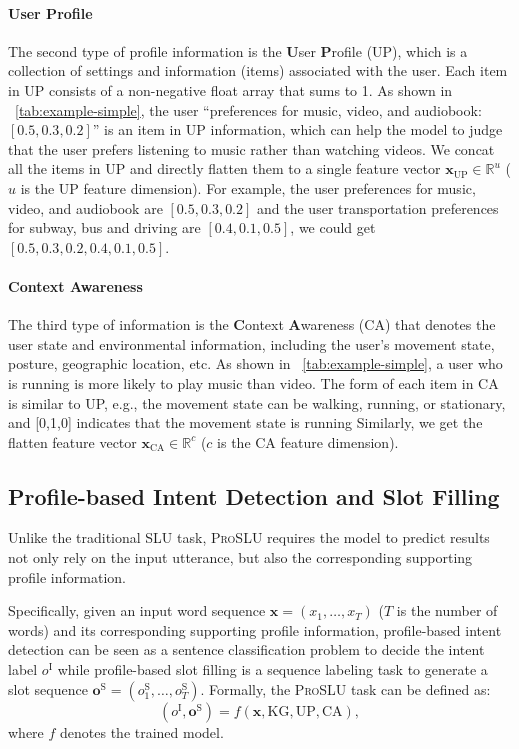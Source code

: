 \documentclass[letterpaper]{article} \usepackage{aaai22}  \usepackage{times}  \usepackage{helvet}  \usepackage{courier}  \usepackage[hyphens]{url}  \usepackage{graphicx} \urlstyle{rm} \def\UrlFont{\rm}  \usepackage{natbib}  \usepackage{caption} \DeclareCaptionStyle{ruled}{labelfont=normalfont,labelsep=colon,strut=off} \frenchspacing  \setlength{\pdfpagewidth}{8.5in}  \setlength{\pdfpageheight}{11in}  \usepackage{algorithm}
\begin{document}
\paragraph{User Profile}
The second type of profile information is the \textbf{U}ser \textbf{P}rofile (UP), 
which is a collection of settings and information (items) associated with the user.
Each item in UP consists of a non-negative float array that sums to 1.
As shown in \tablename~\ref{tab:example-simple}, the user ``preferences for music, video, and audiobook: $[0.5, 0.3, 0.2]$'' is an item in UP information, which can help the model to judge that the user prefers listening to music rather than watching videos. 
We concat all the items in UP and directly flatten them to a single feature vector $\mathbf{x}_{\text{UP}} \in \mathbb{R}^{u}$ ($u$ is the UP feature dimension).
For example, the user preferences for music, video, and audiobook are $[0.5, 0.3, 0.2]$ and the user transportation preferences for subway, bus and driving are $[0.4, 0.1, 0.5]$, we could get $[0.5, 0.3, 0.2, 0.4, 0.1, 0.5]$.

\paragraph{Context Awareness}
The third type of information is the \textbf{C}ontext \textbf{A}wareness (CA) that denotes the user state and environmental information,
including the user's movement state, posture, geographic location, etc.
As shown in \tablename~\ref{tab:example-simple}, a user who is running is more likely to play music than video. 
The form of each item in CA is similar to UP, e.g., the movement state can be walking, running, or stationary, and [0,1,0] indicates that the movement state is running
Similarly, we get the flatten feature vector $\mathbf{x}_{\text{CA}} \in \mathbb{R}^{c}$ ($c$ is the CA feature dimension).

\subsection{Profile-based Intent Detection and Slot Filling}
\label{sec:definition-SLU}
Unlike the traditional SLU task, \textsc{ProSLU} requires the model to predict results not only rely on the input utterance, but also the corresponding supporting profile information.

Specifically, given an input word sequence $\mathbf{x} = (x_1, \dots, x_T)$ ($T$ is the number of words) and its corresponding supporting profile information, 
profile-based intent detection can be seen as a sentence classification problem to decide the intent label $o^{\mathrm{I}}$ while profile-based slot filling is a sequence labeling task to generate a slot sequence $\mathbf{o}^{\mathrm{S}} = (o_1^{\mathrm{S}}, \dots, o_T^{\mathrm{S}})$.
Formally, the \textsc{ProSLU} task can be defined as:
\begin{equation}
	(o^{\mathrm{I}}, \mathbf{o}^{\mathrm{S}}) = f(\mathbf{x}, \text{KG}, \text{UP}, \text{CA}),
\end{equation}
where $f$ denotes the trained model.
\end{document}
